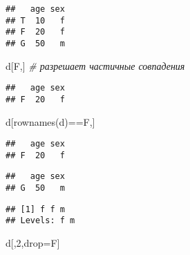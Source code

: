 \documentclass[]{article}
\newenvironment{Shaded}{\begin{snugshade}}{\end{snugshade}}
\newcommand{\CommentTok}[1]{\textcolor[rgb]{0.56,0.35,0.01}{\textit{#1}}}
\newcommand{\DecValTok}[1]{\textcolor[rgb]{0.00,0.00,0.81}{#1}}
\newcommand{\FunctionTok}[1]{\textcolor[rgb]{0.00,0.00,0.00}{#1}}
\newcommand{\NormalTok}[1]{#1}
\newcommand{\OtherTok}[1]{\textcolor[rgb]{0.56,0.35,0.01}{#1}}
\newcommand{\SpecialCharTok}[1]{\textcolor[rgb]{0.00,0.00,0.00}{#1}}
\newcommand{\StringTok}[1]{\textcolor[rgb]{0.31,0.60,0.02}{#1}}
\begin{document}
\begin{verbatim}
##   age sex
## T  10   f
## F  20   f
## G  50   m
\end{verbatim}

\begin{Shaded}
\begin{Highlighting}[]
\NormalTok{d[}\StringTok{\textquotesingle{}F\textquotesingle{}}\NormalTok{,] }\CommentTok{\# разрешает частичные совпадения}
\end{Highlighting}
\end{Shaded}

\begin{verbatim}
##   age sex
## F  20   f
\end{verbatim}

\begin{Shaded}
\begin{Highlighting}[]
\NormalTok{d[}\FunctionTok{rownames}\NormalTok{(d)}\SpecialCharTok{==}\StringTok{\textquotesingle{}F\textquotesingle{}}\NormalTok{,]}
\end{Highlighting}
\end{Shaded}

\begin{verbatim}
##   age sex
## F  20   f
\end{verbatim}

\begin{Shaded}
\end{Shaded}

\begin{verbatim}
##   age sex
## G  50   m
\end{verbatim}

\begin{Shaded}
\end{Shaded}

\begin{verbatim}
## [1] f f m
## Levels: f m
\end{verbatim}

\begin{Shaded}
\begin{Highlighting}[]
\NormalTok{d[,}\DecValTok{2}\NormalTok{,drop}\OtherTok{=}\NormalTok{F]}
\end{Highlighting}
\end{Shaded}
\end{document}
